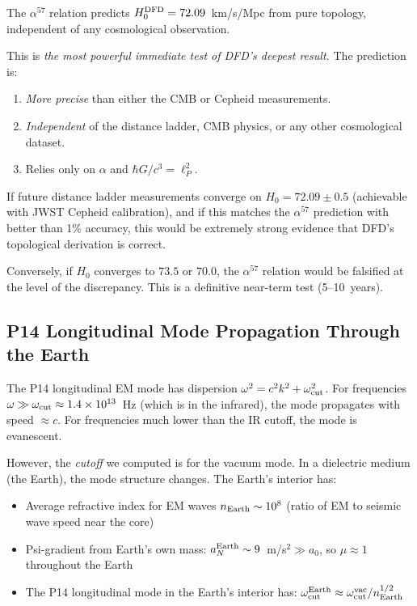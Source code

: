 \documentclass[11pt]{article}
\theoremstyle{definition}
\theoremstyle{remark}
\newcommand{\ee}[1]{\times 10^{#1}}
\begin{document}
The $\alpha^{57}$ relation predicts $H_0^{\rm DFD} = 72.09$~km/s/Mpc
from pure topology, independent of any cosmological observation.

This is \emph{the most powerful immediate test of DFD's deepest result.}
The prediction is:
\begin{enumerate}
\item \emph{More precise} than either the CMB or Cepheid measurements.
\item \emph{Independent} of the distance ladder, CMB physics, or any
  other cosmological dataset.
\item Relies only on $\alpha$ and $\hbar G/c^3 = \ell_P^2$.
\end{enumerate}

If future distance ladder measurements converge on $H_0 = 72.09 \pm 0.5$
(achievable with JWST Cepheid calibration), and if this matches the
$\alpha^{57}$ prediction with better than 1\% accuracy, this would be
extremely strong evidence that DFD's topological derivation is correct.

Conversely, if $H_0$ converges to $73.5$ or $70.0$, the $\alpha^{57}$
relation would be falsified at the level of the discrepancy.
This is a definitive near-term test (5--10~years).

\subsection{P14 Longitudinal Mode Propagation Through the Earth}

The P14 longitudinal EM mode has dispersion $\omega^2 = c^2 k^2 + \omega_{\rm cut}^2$.
For frequencies $\omega \gg \omega_{\rm cut} \approx 1.4\ee{13}$~Hz
(which is in the infrared), the mode propagates with speed $\approx c$.
For frequencies much lower than the IR cutoff, the mode is evanescent.

However, the \emph{cutoff} we computed is for the vacuum mode. In a
dielectric medium (the Earth), the mode structure changes. The Earth's
interior has:
\begin{itemize}
\item Average refractive index for EM waves $n_{\rm Earth} \sim 10^8$
  (ratio of EM to seismic wave speed near the core)
\item Psi-gradient from Earth's own mass: $a_N^{\rm Earth} \sim
  9$~m/s$^2 \gg a_0$, so $\mu \approx 1$ throughout the Earth
\item The P14 longitudinal mode in the Earth's interior has:
  $\omega_{\rm cut}^{\rm Earth} \approx \omega_{\rm cut}^{\rm vac}/n_{\rm Earth}^{1/2}$
\end{itemize}
\end{document}
